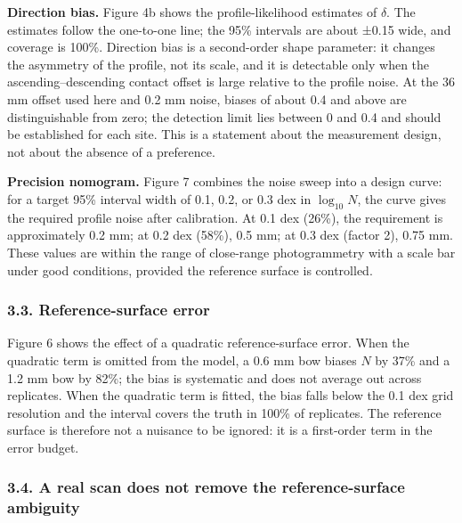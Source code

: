 \documentclass[
]{article}
\begin{document}
\textbf{Direction bias.} Figure 4b shows the profile-likelihood
estimates of \(\delta\). The estimates follow the one-to-one line; the
95\% intervals are about ±0.15 wide, and coverage is 100\%. Direction
bias is a second-order shape parameter: it changes the asymmetry of the
profile, not its scale, and it is detectable only when the
ascending--descending contact offset is large relative to the profile
noise. At the 36 mm offset used here and 0.2 mm noise, biases of about
0.4 and above are distinguishable from zero; the detection limit lies
between 0 and 0.4 and should be established for each site. This is a
statement about the measurement design, not about the absence of a
preference.

\textbf{Precision nomogram.} Figure 7 combines the noise sweep into a
design curve: for a target 95\% interval width of 0.1, 0.2, or 0.3 dex
in \(\log_{10}N\), the curve gives the required profile noise after
calibration. At 0.1 dex (26\%), the requirement is approximately 0.2 mm;
at 0.2 dex (58\%), 0.5 mm; at 0.3 dex (factor 2), 0.75 mm. These values
are within the range of close-range photogrammetry with a scale bar
under good conditions, provided the reference surface is controlled.

\subsubsection{3.3. Reference-surface
error}\label{reference-surface-error}

Figure 6 shows the effect of a quadratic reference-surface error. When
the quadratic term is omitted from the model, a 0.6 mm bow biases \(N\)
by 37\% and a 1.2 mm bow by 82\%; the bias is systematic and does not
average out across replicates. When the quadratic term is fitted, the
bias falls below the 0.1 dex grid resolution and the interval covers the
truth in 100\% of replicates. The reference surface is therefore not a
nuisance to be ignored: it is a first-order term in the error budget.

\subsubsection{3.4. A real scan does not remove the reference-surface
ambiguity}\label{a-real-scan-does-not-remove-the-reference-surface-ambiguity}
\end{document}
